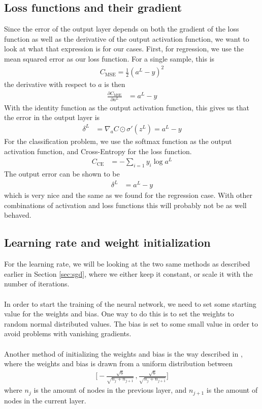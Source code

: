\documentclass[a4paper]{article}
\newcommand\pd[2]{\frac{\partial #1}{\partial #2}}
\begin{document}
\subsection{Loss functions and their gradient} \label{sec:loss}
Since the error of the output layer depends on both the gradient of the loss function as well as the derivative of the output activation function, we want to look at what that expression is for our cases. First, for regression, we use the mean squared error as our loss function. For a single sample, this is
\begin{align*}
C_{\text{MSE}} = \frac{1}{2}(a^L - y)^2
\end{align*}
the derivative with respect to $a$ is then
\begin{align*}
\pd{C_{\text{MSE}}}{a^L} &= a^L - y
\end{align*}
With the identity function as the output activation function, this gives us that the error in the output layer is
\begin{align*}
	\delta^L &= \nabla_a C\odot\sigma'(z^L) = a^L - y
\end{align*}
For the classification problem, we use the softmax function as the output activation function, and Cross-Entropy for the loss function.
\begin{align*}
C_{\text{CE}} &= -\sum_{i=1}y_i\log a^L
\end{align*}
The output error can be shown to be
\begin{align*}
	\delta^L &= a^L - y
\end{align*}
which is very nice and the same as we found for the regression case. With other combinations of activation and loss functions this will probably not be as well behaved.
\subsection{Learning rate and weight initialization} \label{sec:weights}
For the learning rate, we will be looking at the two same methods as described earlier in Section \ref{sec:sgd}, where we either keep it constant, or scale it with the number of iterations.
\\\\
In order to start the training of the neural network, we need to set some starting value for the weights and bias. One way to do this is to set the weights to random normal distributed values. The bias is set to some small value in order to avoid problems with vanishing gradients.
\\\\
Another method of initializing the weights and bias is the way described in \cite{glorot}, where the weights and bias is drawn from a uniform distribution between
\begin{align*}
	\bigg[-\frac{\sqrt{6}}{\sqrt{n_j + n_{j+1}}}\,, \frac{\sqrt{6}}{\sqrt{n_j + n_{j+1}}}\bigg]
\end{align*}
where $n_j$ is the amount of nodes in the previous layer, and $n_{j+1}$ is the amount of nodes in the current layer.
\end{document}
